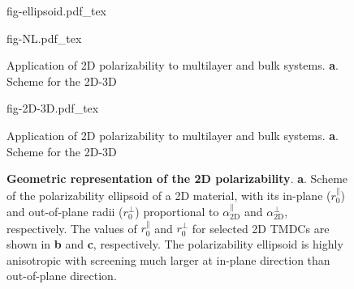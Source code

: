 \begin{figure}[!htbp]
  \centering
  {fig-ellipsoid.pdf_tex}
  \caption{%
  }
  \label{fig:diel-ellipsoid}
\end{figure}

\begin{figure}[!htbp]
\centering
{fig-NL.pdf_tex}
  \caption{\label{fig:diel-NL}  %
    Application of 2D polarizability to
    multilayer and bulk systems.
    \textbf{a}. Scheme for the 2D-3D}

\end{figure}

\begin{figure}[!htbp]
\centering
{fig-2D-3D.pdf_tex}
  \caption{\label{fig:diel-2D-3D}  %
    Application of 2D polarizability to
    multilayer and bulk systems.
    \textbf{a}. Scheme for the 2D-3D}
\end{figure}



\begin{figure}[H]
  \centering
  \caption{\label{fig-ellip} \textbf{Geometric representation of the
      2D polarizability}. \textbf{a}. Scheme of the polarizability
    ellipsoid of a 2D material, with its in-plane
    ($r_{0}^{\parallel}$) and out-of-plane radii
    ($r_{\mathrm{0}}^{\perp}$) proportional to
    $\alpha_{\mathrm{2D}}^{\parallel}$ and
    $\alpha_{\mathrm{2D}}^{\perp}$, respectively.  The values of
    $r_{0}^{\parallel}$ and $r_{0}^{\perp}$ for selected 2D TMDCs are
    shown in \textbf{b} and \textbf{c}, respectively.  The
    polarizability ellipsoid is highly anisotropic with screening much
    larger at in-plane direction than out-of-plane direction.}
\end{figure}







